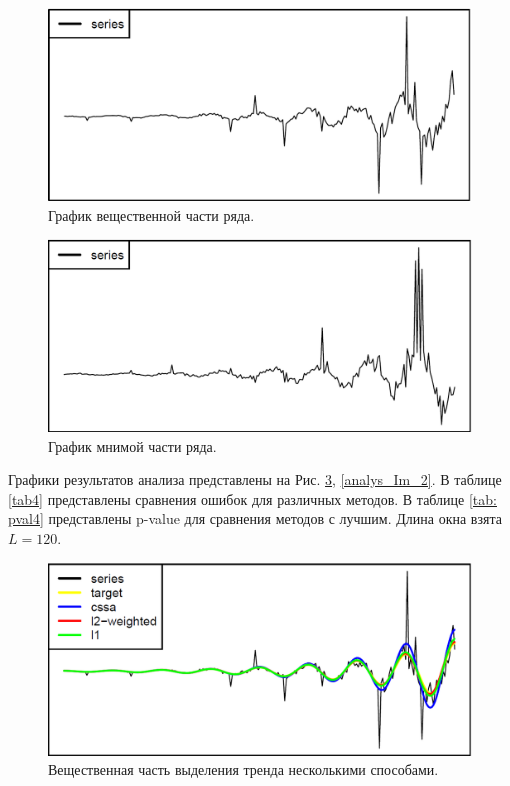 \documentclass[specialist,
               substylefile = spbu.rtx,
               subf,href,colorlinks=true, 12pt]{disser}
\begin{document}
\begin{figure}[H]
	\begin{center}
		\includegraphics[width=0.67\linewidth]{img/ser_2_Re.png}
		\caption{График вещественной части ряда.}
		\label{ser_Re_2}
	\end{center}
\end{figure}

\begin{figure}[H]
	\begin{center}
		\includegraphics[width=0.67\linewidth]{img/ser_2_Im.png}
		\caption{График мнимой части ряда.}
		\label{ser_Im_2}
	\end{center}
\end{figure}

Графики результатов анализа представлены на Рис. \ref{analys_Re_2}, \ref{analys_Im_2}. В таблице \ref{tab4} представлены сравнения ошибок для различных методов. В таблице \ref{tab: pval4} представлены p-value для сравнения методов с лучшим. Длина окна взята $L = 120$.

\begin{figure}[H]
	\begin{center}
		\includegraphics[width=0.67\linewidth]{img/analys_2_Re.png}
		\caption{Вещественная часть выделения тренда несколькими способами.}
		\label{analys_Re_2}
	\end{center}
\end{figure}
\end{document}
